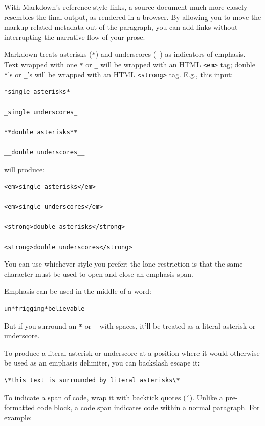 With Markdown's reference-style links, a source document much more
closely resembles the final output, as rendered in a browser. By
allowing you to move the markup-related metadata out of the paragraph,
you can add links without interrupting the narrative flow of your
prose.

Markdown treats asterisks (\texttt{*}) and underscores (\texttt{\_}) as indicators of
emphasis. Text wrapped with one \texttt{*} or \texttt{\_} will be wrapped with an
HTML \texttt{<em>} tag; double \texttt{*}'s or \texttt{\_}'s will be wrapped with an HTML
\texttt{<strong>} tag. E.g., this input:

\begin{verbatim}
*single asterisks*

_single underscores_

**double asterisks**

__double underscores__
\end{verbatim}

will produce:

\begin{verbatim}
<em>single asterisks</em>

<em>single underscores</em>

<strong>double asterisks</strong>

<strong>double underscores</strong>
\end{verbatim}

You can use whichever style you prefer; the lone restriction is that
the same character must be used to open and close an emphasis span.

Emphasis can be used in the middle of a word:

\begin{verbatim}
un*frigging*believable
\end{verbatim}

But if you surround an \texttt{*} or \texttt{\_} with spaces, it'll be treated as a
literal asterisk or underscore.

To produce a literal asterisk or underscore at a position where it
would otherwise be used as an emphasis delimiter, you can backslash
escape it:

\begin{verbatim}
\*this text is surrounded by literal asterisks\*
\end{verbatim}

To indicate a span of code, wrap it with backtick quotes (\texttt{`}).
Unlike a pre-formatted code block, a code span indicates code within a
normal paragraph. For example:

